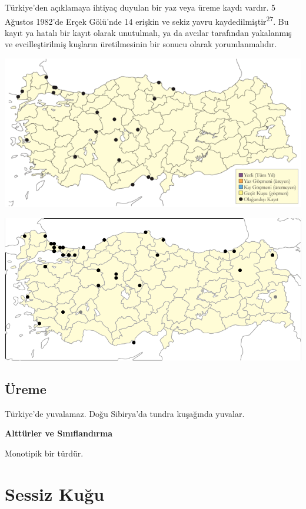 \documentclass[
  letterpaper,
  DIV=11,
  numbers=noendperiod]{scrreprt}
\begin{document}
Türkiye'den açıklamaya ihtiyaç duyulan bir yaz veya üreme kaydı vardır.
5 Ağustos 1982'de Erçek Gölü'nde 14 erişkin ve sekiz yavru
kaydedilmiştir\textsuperscript{27}. Bu kayıt ya hatalı bir kayıt olarak
unutulmalı, ya da avcılar tarafından yakalanmış ve evcilleştirilmiş
kuşların üretilmesinin bir sonucu olarak yorumlanmalıdır.

\includegraphics{images/harita_Page_007.png}

\includegraphics[width=6.25in,height=\textheight]{images/harita_Branta_ruficollis.png}

\hypertarget{uxfcreme-6}{%
\subsection{\texorpdfstring{\textbf{Üreme}}{Üreme}}\label{uxfcreme-6}}

Türkiye'de yuvalamaz. Doğu Sibirya'da tundra kuşağında yuvalar.

\textbf{Alttürler ve Sınıflandırma}

Monotipik bir türdür.

\hypertarget{sessiz-kuux11fu}{%
\section{Sessiz Kuğu}\label{sessiz-kuux11fu}}
\end{document}
